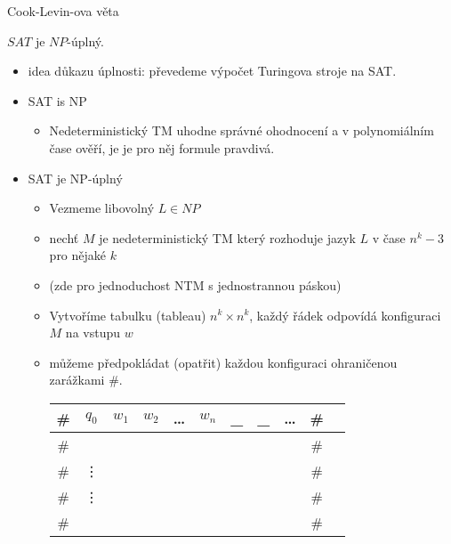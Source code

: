 
  
    
    \begin{frame}{Cook-Levin-ova věta}
    
    \begin{theorem}
    $SAT$ je $NP$-úplný.
    \end{theorem}
    \begin{itemize}
        \item idea důkazu úplnosti: převedeme výpočet Turingova stroje na SAT.
    \end{itemize}
    \end{frame}
    
    
    \begin{frame}{}
    \begin{proofs}
    \begin{itemize}
        \item SAT is NP
        
        \begin{itemize}
            \item Nedeterministický TM uhodne správné ohodnocení a v polynomiálním čase ověří, je je pro něj formule pravdivá.
        \end{itemize}
    \pause
     \item SAT je NP-úplný
        
        \begin{itemize}[<+->]
            \item Vezmeme libovolný $L\in NP$
            \item nechť $M$ je nedeterministický TM který rozhoduje jazyk $L$ v čase $n^k-3$ pro nějaké $k$ 
      \item (zde pro jednoduchost NTM s jednostrannou páskou)
            \item Vytvoříme tabulku (tableau) $n^k\times n^k$, každý řádek odpovídá konfiguraci $M$ na vstupu $w$
            \item můžeme předpokládat (opatřit) každou konfiguraci ohraničenou zarážkami $\#$.
        
            \begin{tabular}{|c|c|c|c|c|c|c|c|c|c|c|}\hline
            \# & $q_0$ & $w_1$ &$w_2$ & \ldots &$w_n$ & \_  &\_  &  \ldots &\# \\\hline
            \# &       &       &       &       &       &       &       &  &\# \\\hline
            \# & \vdots &       &       &       &       &       &       &&\# \\
            \# & \vdots &       &       &       &       &       &       &&\# \\\hline
            \# &       &       &       &       &       &       &       &  &\# \\\hline
                

\end{tabular}
\end{itemize}
\end{itemize}
\end{proofs}
\end{frame}
